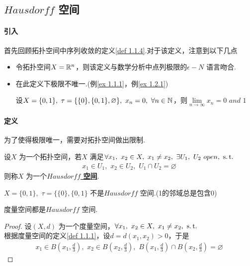 \newpage
\subsection{$Hausdorff$ 空间}
\paragraph{引入}
	首先回顾拓扑空间中序列收敛的定义\ref{def 1.1.4}.对于该定义，注意到以下几点
	\begin{itemize}
		\item 令拓扑空间$X = \mathbb{R}^{n}$，则该定义与数学分析中点列极限的$\epsilon - N$ 语言吻合.
		
		\item 在此定义下极限不唯一.(例\ref{ex 1.1.1}，例\ref{ex 1.2.1})
		\begin{example}\label{ex 1.2.1}
			设$X = \{ 0 , 1 \} , \,\, \tau = \{ \{ 0 \} , \{ 0 , 1 \} , \varnothing \} , \,\, x_n = 0 , \,\, \forall n \in \mathbb{N}$，则$\underset{n \to \infty}{\lim}{x_n} = 0 \,\, and \,\, 1$
		\end{example}
	\end{itemize}

\vspace*{2em}
\paragraph{定义}
	为了使得极限唯一，需要对拓扑空间做出限制.
	\begin{defn}\label{def 1.2.3}
		设$X$ 为一个拓扑空间，若$X$ 满足$\forall x_1 , \,\, x_2 \in X , \,\, x_1 \neq x_2 , \,\, \exists U_1 , \,\, U_2 \,\, open , \,\, \operatorname{s.t.}$
		\begin{align}
			x_1 \in U_1 , \,\, x_2 \in U_2 , \,\, U_1 \cap U_2 = \varnothing
		\end{align}
		则称$X$ 为一个\underline{\textbf{$Hausdorff$ 空间}}.
	\end{defn}

	\begin{example}\label{ex 1.2.2}
		$X = \{ 0 , 1 \} , \,\, \tau = \{ \{ 0 \} , \{ 0 , 1 \}$ 不是$Hausdorff$ 空间.(1的邻域总是包含0)
	\end{example}

	\begin{example}\label{ex 1.2.3}
		度量空间都是$Hausdorff$ 空间.
		\begin{proof}
			设$(X , d)$ 为一个度量空间，$\forall x_1 , \,\, x_2 \in X , \,\, x_1 \neq x_2 , \,\, \operatorname{s.t.}$\\
			根据度量空间的定义\ref{def 1.1.1}，设$d = d(x_1 , x_2) > 0$，于是
			\begin{align}
				x_1 \in B(x_1 , \frac{d}{3}) , \,\, x_2 \in B(x_2 , \frac{d}{3}) , \,\, B(x_1 , \frac{d}{3}) \cap B(x_2 , \frac{d}{3}) = \varnothing
			\end{align}
		\end{proof}
	\end{example}

